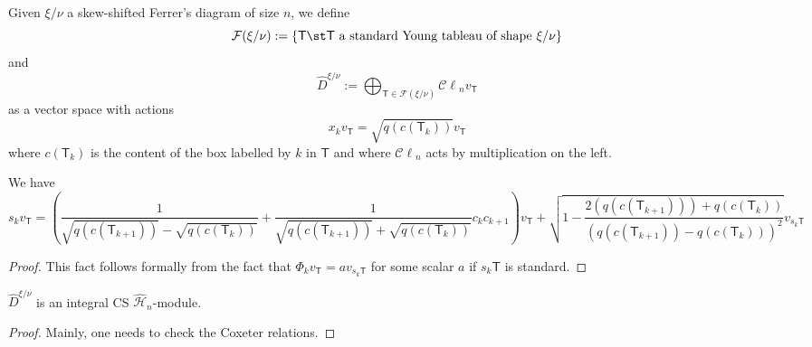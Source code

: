 \documentclass[11pt,leqno,oneside]{amsbook}
\newcommand{\T}{\mathsf{T}} %
\renewcommand{\H}{\mathcal{H}}
\newcommand{\Cl}{\mathcal{C\ell}} %
\newcommand{\T}{\mathfs{T}} %
\newcommand{\cF}{\mathcal{F}}
\numberwithin{thm}{section}
\begin{document}
\begin{defn}
  Given \(\xi/\nu\) a skew-shifted Ferrer's diagram of size \(n\), we
  define \[
    \cF(\xi/\nu) := \{\T \st \T \text{ a standard Young tableau of
      shape }\xi/\nu\}
  \]
  and \[
    \hat{D}^{\xi/\nu} := \bigoplus_{\T \in \cF(\xi/\nu)} \Cl_n v_\T
  \]
  as a vector space with actions \[
    x_k v_\T = \sqrt{q(c(\T_k))} v_\T
  \]
  where \(c(\T_k)\) is the content of the box labelled by \(k\) in
  \(\T\) and where \(\Cl_n\) acts by multiplication on the left.
\end{defn}
\begin{prop}
  We have \[
    s_k v_\T = \left(
      \frac{1}{\sqrt{q(c(\T_{k+1}))}-\sqrt{q(c(\T_k))}} +
      \frac{1}{\sqrt{q(c(\T_{k+1}))}+\sqrt{q(c(\T_k))}} c_k c_{k+1}
    \right) v_\T + \sqrt{1 -
      \frac{2(q(c(\T_{k+1})))+q(c(\T_k))}{(q(c(\T_{k+1}))-q(c(\T_k)))^2}}
    v_{s_k \T}
  \]
\end{prop}
\begin{proof}
  This fact follows formally from the fact that \(\Phi_k v_\T = a
  v_{s_k \T}\) for some scalar \(a\) if \(s_k \T\) is
  standard. 
\end{proof}
\begin{cor}
  \(\hat{D}^{\xi/\nu}\) is an integral CS \(\hat{\H}_n\)-module.
\end{cor}
\begin{proof}
  Mainly, one needs to check the Coxeter relations. 
\end{proof}
\end{document}

